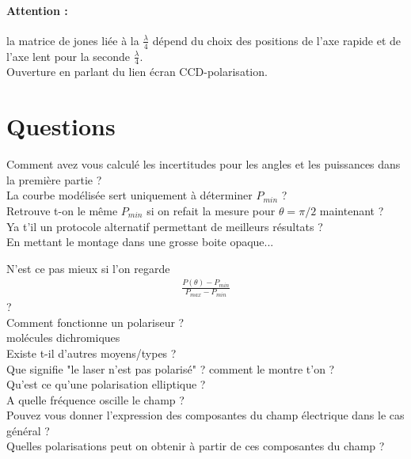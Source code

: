 \documentclass[12pt,prb,aps,epsf]{report}
\begin{document}
\paragraph{Attention :} la matrice de jones liée à la $\frac{\lambda}{4}$ dépend du choix des positions de l'axe rapide et de l'axe lent pour la seconde $\frac{\lambda}{4}$.\\

Ouverture en parlant du lien écran CCD-polarisation.

\section*{Questions}
Comment avez vous calculé les incertitudes pour les angles et les puissances dans la première partie ?\\

La courbe modélisée sert uniquement à déterminer $P_{min}$ ?\\

Retrouve t-on le même $P_{min}$ si on refait la mesure pour $\theta = \pi/2$ maintenant ?\\

Ya t'il un protocole alternatif permettant de meilleurs résultats ?\\
En mettant le montage dans une grosse boite opaque...

N'est ce pas mieux si l'on regarde 
\begin{eqnarray}
\frac{P(\theta) - P_{min}}{P_{max}-P_{min}}
\end{eqnarray}
?\\

Comment fonctionne un polariseur ?\\
molécules dichromiques \\

Existe t-il d'autres moyens/types ?\\

Que signifie "le laser n'est pas polarisé" ? comment le montre t'on ?\\

Qu'est ce qu'une polarisation elliptique ?\\

A quelle fréquence oscille le champ ?\\

Pouvez vous donner l'expression des composantes du champ électrique dans le cas général ?\\ 

Quelles polarisations peut on obtenir à partir de ces composantes du champ ?\\
\end{document}
